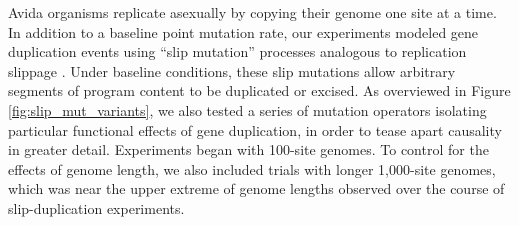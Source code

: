 Avida organisms replicate asexually by copying their genome one site at a time.
In addition to a baseline point mutation rate, our experiments
modeled gene duplication events using ``slip mutation'' processes analogous to replication slippage \citep{bzymek_instability_2001}.
Under baseline conditions, these slip mutations allow arbitrary segments of program content to be duplicated or excised.
As overviewed in Figure \ref{fig:slip_mut_variants}, we also tested a series of mutation operators isolating particular functional effects of gene duplication, in order to tease apart causality in greater detail.
Experiments began with 100-site genomes.
To control for the effects of genome length, we also included trials with longer 1,000-site genomes, which was near the upper extreme of genome lengths observed over the course of slip-duplication experiments.



